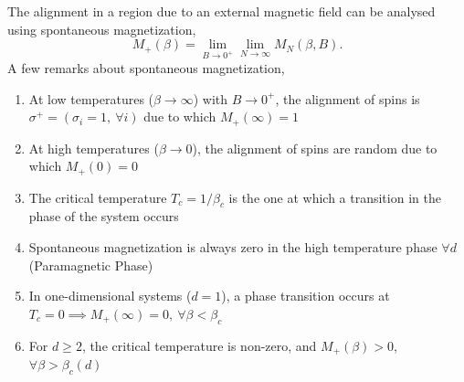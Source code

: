 \documentclass[letterpaper,english,10pt]{article}
\begin{document}
\begin{defn} The alignment in a region due to an external magnetic field can be analysed using spontaneous magnetization,
$$M_{+}(\beta) = \lim \limits_{B \rightarrow 0^{+}}\limits \lim_{N\rightarrow\infty}M_{N}(\beta,B).$$
A few remarks about spontaneous magnetization,
\begin{enumerate}
	\item At low temperatures ($\beta \to \infty$) with $B \to 0^{+}$, the alignment of spins is $\sigma^{+} = (\sigma_{i} = 1,~\forall i)$ due to which $M_{+}(\infty) = 1$
	\item At high temperatures ($\beta \to 0$), the alignment of spins are random due to which $M_{+}(0) = 0$
	\item The critical temperature $T_{c} = 1/\beta_{c}$ is the one at which  a transition in the phase of the system occurs
	\item Spontaneous magnetization is always zero in the high temperature phase $\forall d$ (Paramagnetic Phase)
	\item In one-dimensional systems ($d=1$), a phase transition occurs at $T_{c} = 0 \implies M_{+}(\infty) = 0,~\forall \beta < \beta_{c}$
	\item For $d\geq 2$, the critical temperature is non-zero, and $M_{+}(\beta)>0$, $\forall \beta > \beta_{c}(d)$
	\end{enumerate}
\end{defn}
\end{document}
